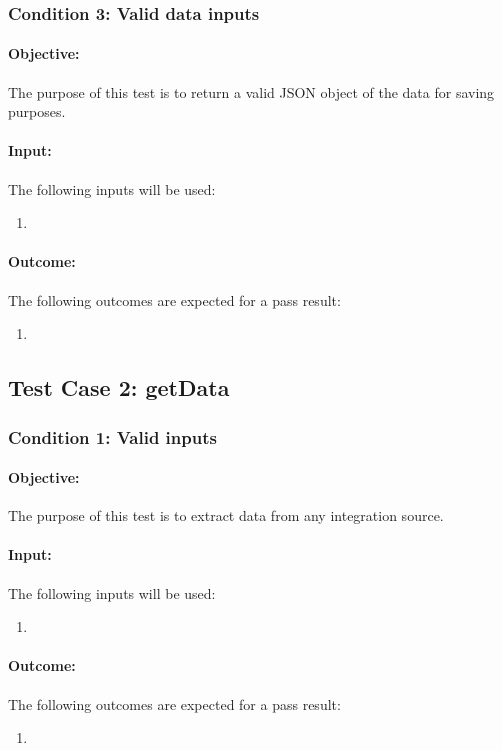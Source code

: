 \documentclass{article}
\begin{document}
\subsubsection{Condition 3: Valid data inputs}
\paragraph{Objective:} The purpose of this test is to return a valid JSON object of the data for saving purposes.
\paragraph{Input:} The following inputs will be used:
\begin{enumerate}
	\item 
\end{enumerate}
\paragraph{Outcome:} The following outcomes are expected for a pass result:
\begin{enumerate}
	\item 
\end{enumerate}

\subsection{Test Case 2: getData}\label{test2}
\subsubsection{Condition 1: Valid inputs }
\paragraph{Objective:} The purpose of this test is to extract data from any integration source.
\paragraph{Input:} The following inputs will be used:
\begin{enumerate}
	\item 
\end{enumerate}
\paragraph{Outcome:} The following outcomes are expected for a pass result:
\begin{enumerate}
	\item 
\end{enumerate}
\end{document}
